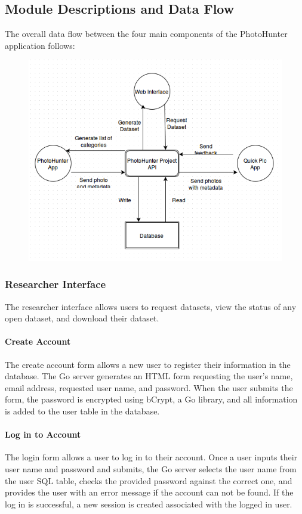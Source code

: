 \documentclass{article}
\begin{document}
\subsection{Module Descriptions and Data Flow}
The overall data flow between the four main components of the PhotoHunter
application follows:
\begin{figure}
  \centering
  \includegraphics[scale = 0.5]{ss_flowchart}
\end{figure}

\subsubsection{Researcher Interface}
The researcher interface allows users to request datasets, view the status of
any open dataset, and download their dataset.

\paragraph{Create Account}
The create account form allows a new user to register their information in the
database. The Go server generates an HTML form requesting the user's name,
email address, requested user name, and password. When the user submits the
form, the password is encrypted using bCrypt, a Go library, and all information
is added to the user table in the database.

\paragraph{Log in to Account}
The login form allows a user to log in to their account. Once a user inputs
their user name and password and submits, the Go server selects the user name
from the user SQL table, checks the provided password against the correct one,
and provides the user with an error message if the account can not be found. If
the log in is successful, a new session is created associated with the logged
in user.
\end{document}
